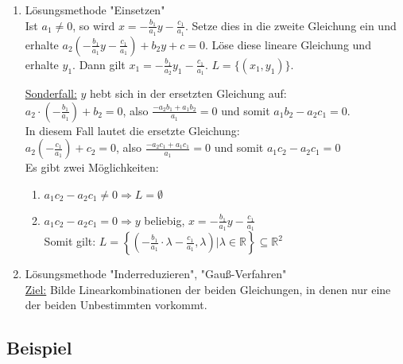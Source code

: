     \begin{enumerate}
    \item Lösungsmethode "Einsetzen"\\
    Ist $a_1 \neq0$, so wird $x=-\frac{b_1}{a_1}y-\frac{c_1}{a_1}$. Setze dies in die zweite Gleichung ein und
    erhalte $a_2\left( -\frac{b_1}{a_1}y-\frac{c_1}{a_1}  \right)+b_2 y+c=0$. Löse diese lineare Gleichung 
    und erhalte $y_1$. Dann gilt $x_1=-\frac{b_1}{a_2}y_1-\frac{c_1}{a_1}$. $L=\{(x_1,y_1)\}$.\\ \newline
    
   	\underline{Sonderfall:} $y$ hebt sich in der ersetzten Gleichung auf:\\
    $a_2\cdot \left( - \frac{b_1}{a_1} \right)+b_2=0$, also $ \frac{-a_2 b_1+a_1 b_2}{a_1}=0$ und somit
    $a_1 b_2 - a_2 c_1=0$.\\ \newline
    In diesem Fall lautet die ersetzte Gleichung:\\
    $a_2 \left( -\frac{c_1}{a_1}\right)+c_2=0$, also $\frac{-a_2 c_1+a_1 c_1}{a_1}=0$ und somit
    $a_1 c_2-a_2 c_1=0$\\ \newline
    Es gibt zwei Möglichkeiten:
    	\begin{enumerate}
		\item $a_1 c_2 - a_2 c_1 \neq 0 \Rightarrow L=\emptyset$
		\item $a_1 c_2 - a_2 c_1 = 0 \Rightarrow y$ beliebig, $x=-\frac{b_1}{a_1}y-\frac{c_1}{a_1}$\\
		Somit gilt: 
		$L=\left\{\left( -\frac{b_1}{a_1}\cdot \lambda-\frac{c_1}{a_1},\lambda \right)\big\vert 
		\lambda\in \mathbb{R} \right\} \subseteq \mathbb{R}^2$  
    	
    	\end{enumerate}
  
  	\item Lösungsmethode "Inderreduzieren", "Gauß-Verfahren"\\
  	\underline{Ziel:} Bilde Linearkombinationen der beiden Gleichungen, 
  	in denen nur eine der beiden Unbestimmten vorkommt.
  
    \end{enumerate}
              

\subsection{Beispiel}

